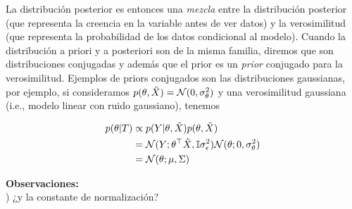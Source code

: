 La distribución posterior es entonces una \emph{mezcla} entre la distribución posterior (que representa la creencia en la variable antes de ver datos) y la verosimilitud (que representa la probabilidad de los datos condicional al modelo). Cuando la distribución a priori y a posteriori son de la misma familia, diremos que son distribuciones conjugadas y además que el prior es un \emph{prior} conjugado para la verosimilitud. Ejemplos de priors conjugados son las distribuciones gaussianas, por ejemplo, si consideramos $p(\theta,\tilde{X}) = {\mathcal N}(0,\sigma_\theta^2)$ y una verosimilitud gaussiana (i.e., modelo linear con ruido gaussiano), tenemos

\begin{align}
	p(\theta|T)	&\propto p(Y|\theta,\tilde{X})p(\theta,\tilde{X})\\
				&= {\mathcal N}(Y;\theta^\top\tilde{X},{\mathbb I}\sigma_\epsilon^2){\mathcal N}(\theta;0,\sigma_\theta^2)\\
				&={\mathcal N}(\theta; \mu,\Sigma)
\end{align}

\noindent\textbf{Observaciones:}\\
) ¿y la constante de normalización?

